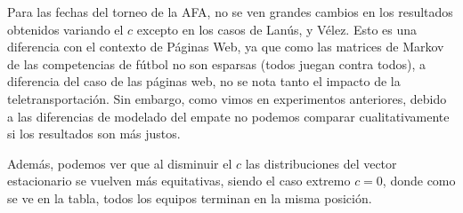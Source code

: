 \hspace{1cm}

\par Para las fechas del torneo de la AFA, no se ven grandes cambios en los resultados obtenidos variando el $c$ excepto en los casos de Lanús, y Vélez. Esto es una diferencia con el contexto de Páginas Web, ya que como las matrices de Markov de las competencias de fútbol no son esparsas (todos juegan contra todos), a diferencia del caso de las páginas web, no se nota tanto el impacto de la teletransportación. Sin embargo, como vimos en experimentos anteriores, debido a las diferencias de modelado del empate no podemos comparar cualitativamente si los resultados son más justos. 
\par Además, podemos ver que al disminuir el $c$ las distribuciones del vector estacionario se vuelven más equitativas, siendo el caso extremo $c = 0$, donde como se ve en la tabla, todos los equipos terminan en la misma posición.

